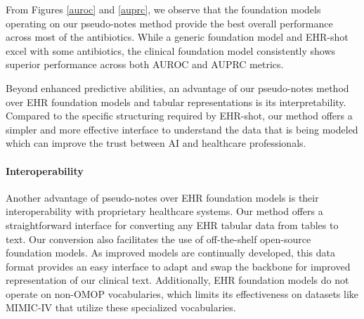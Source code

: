 \documentclass{article}
\theoremstyle{plain}
\theoremstyle{definition}
\theoremstyle{remark}
\begin{document}
From Figures \ref{auroc} and \ref{auprc}, we observe that the foundation models operating on our pseudo-notes method provide the best overall performance across most of the antibiotics. While a generic foundation model and EHR-shot excel with some antibiotics, the clinical foundation model consistently shows superior performance across both AUROC and AUPRC metrics.

Beyond enhanced predictive abilities, an advantage of our pseudo-notes method over EHR foundation models and tabular representations is its interpretability. Compared to the specific structuring required by EHR-shot, our method offers a simpler and more effective interface to understand the data that is being modeled which can improve the trust between AI and healthcare professionals.

\paragraph{Interoperability}

Another advantage of pseudo-notes over EHR foundation models is their interoperability with proprietary healthcare systems. Our method offers a straightforward interface for converting any EHR tabular data from tables to text. Our conversion also facilitates the use of off-the-shelf open-source foundation models. As improved models are continually developed, this data format provides an easy interface to adapt and swap the backbone for improved representation of our clinical text. Additionally, EHR foundation models do not operate on non-OMOP vocabularies, which limits its effectiveness on datasets like MIMIC-IV that utilize these specialized vocabularies.

\end{document}
